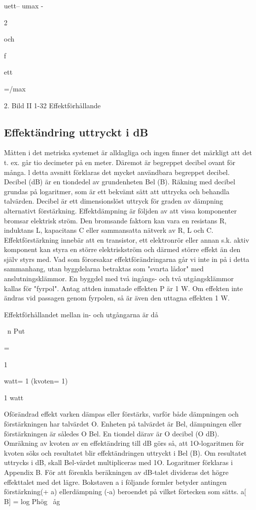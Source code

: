 uett-- umax
-{2

och

f

ett

=/max

{2.
Bild II 1-32 Effektförhållande

\subsection{Effektändring uttryckt i dB}
Måtten i det metriska systemet är alldagliga
och ingen finner det märkligt att det t. ex. går
tio decimeter på en meter. Däremot är begreppet decibel ovant för många.
l detta avsnitt förklaras det mycket användbara begreppet decibel. Decibel (dB) är
en tiondedel av grundenheten Bel (B).
Räkning med decibel grundas på logaritmer, som är ett bekvämt sätt att uttrycka och
behandla talvärden.
Decibel är ett dimensionslöst uttryck
för graden av dämpning alternativt förstärkning.
Effektdämpning är följden av att vissa
komponenter bromsar elektrisk ström. Den
bromsande faktorn kan vara en resistans R,
induktans L, kapacitans C eller sammansatta nätverk av R, L och C.
Effektförstärkning innebär att en transistor, ett elektronrör eller annan s.k. aktiv
komponent kan styra en större elektriskström
och därmed större effekt än den själv styrs
med. Vad som förorsakar effektförändringarna går vi inte in på i detta sammanhang,
utan byggdelarna betraktas som "svarta lådor" med anslutningsklämmor.
En byggdel med två ingångs- och två
utgångsklämmor kallas för "fyrpol".
Antag attden inmatade effekten P är 1 W.
Om effekten inte ändras vid passagen genom fyrpolen, så är även den uttagna effekten 1 W.

Effektförhållandet mellan in- och utgångarna är då

~n
Put

=

1

watt= 1 (kvoten= 1)

1 watt

Oförändrad effekt varken dämpas eller
förstärks, varför både dämpningen och förstärkningen har talvärdet O. Enheten på talvärdet är Bel, dämpningen eller förstärkningen är således O Bel. En tiondel därav är
O decibel (O dB).
Omräkning av kvoten av en effektändring
till dB görs så, att 1O-logaritmen för kvoten
söks och resultatet blir effektändringen uttryckt i Bel (B). Om resultatet uttrycks i dB,
skall Bel-värdet multipliceras med 1O.
Logaritmer förklaras i Appendix B.
För att förenkla beräkningen av dB-talet
divideras det högre effekttalet med det lägre.
Bokstaven a i följande formler betyder antingen förstärkning(+ a) ellerdämpning (-a)
beroendet på vilket förtecken som sätts.
a[ B] = log Phög
~åg

}}
